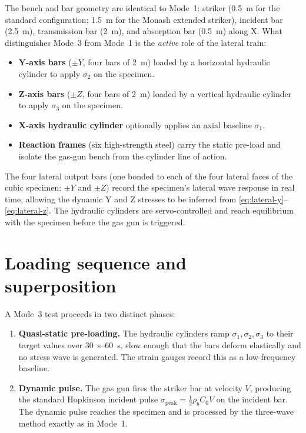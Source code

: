 \documentclass[11pt,a4paper,openany]{book}
\providecommand{\SI}[2]{\qty{#1}{#2}}
\providecommand{\SIrange}[3]{\qtyrange{#1}{#2}{#3}}
\theoremstyle{handbook}
\newcommand{\sig}{\sigma}
\newcommand{\Cz}{C_0}
\newcommand{\sigpeak}{\sig_{\text{peak}}}
\begin{document}
The bench and bar geometry are identical to Mode~1: striker
(\SI{0.5}{m} for the standard configuration; \SI{1.5}{m} for the Monash
extended striker), incident bar (\SI{2.5}{m}), transmission bar (\SI{2}{m}),
and absorption bar (\SI{0.5}{m}) along X. What distinguishes Mode~3 from
Mode~1 is the \emph{active} role of the lateral train:

\begin{itemize}[leftmargin=*,itemsep=3pt]
  \item \textbf{Y-axis bars} ($\pm Y$, four bars of \SI{2}{m}) loaded by
        a horizontal hydraulic cylinder to apply $\sig_2$ on the specimen.
  \item \textbf{Z-axis bars} ($\pm Z$, four bars of \SI{2}{m}) loaded by
        a vertical hydraulic cylinder to apply $\sig_3$ on the specimen.
  \item \textbf{X-axis hydraulic cylinder} optionally applies an axial
        baseline $\sig_1$.
  \item \textbf{Reaction frames} (six high-strength steel) carry the
        static pre-load and isolate the gas-gun bench from the cylinder
        line of action.
\end{itemize}

\noindent The four lateral output bars (one bonded to each of the four
lateral faces of the cubic specimen: $\pm Y$ and $\pm Z$) record the
specimen's lateral wave response in real time, allowing the dynamic Y and
Z stresses to be inferred from \eqref{eq:lateral-y}--\eqref{eq:lateral-z}.
The hydraulic cylinders are servo-controlled and reach equilibrium with
the specimen before the gas gun is triggered.

\section{Loading sequence and superposition}

A Mode~3 test proceeds in two distinct phases:

\begin{enumerate}[leftmargin=*,itemsep=3pt]
  \item \textbf{Quasi-static pre-loading.} The hydraulic cylinders ramp
        $\sig_1,\sig_2,\sig_3$ to their target values over
        \SIrange{30}{60}{s}, slow enough that the bars deform elastically
        and no stress wave is generated. The strain gauges record this as
        a low-frequency baseline.
  \item \textbf{Dynamic pulse.} The gas gun fires the striker bar at
        velocity $V$, producing the standard Hopkinson incident pulse
        $\sigpeak=\tfrac{1}{2}\rho_b\Cz V$ on the incident bar. The
        dynamic pulse reaches the specimen and is processed by the
        three-wave method exactly as in Mode~1.
\end{enumerate}
\end{document}
